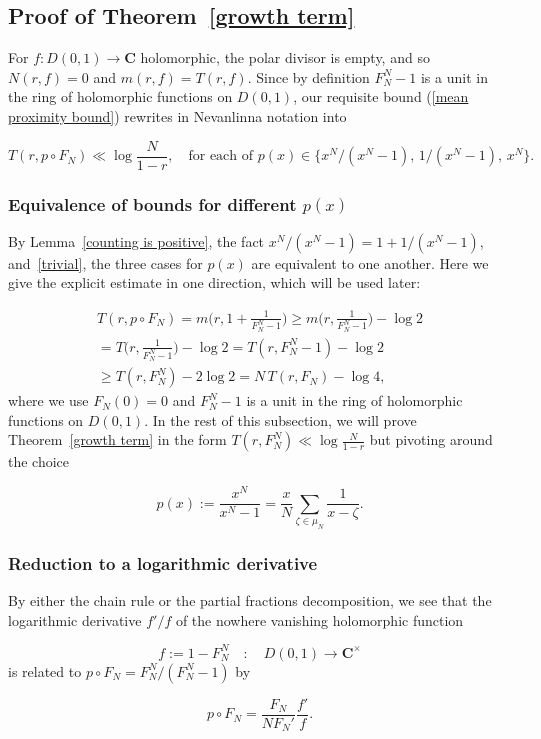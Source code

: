 \documentclass[10pt]{amsart}
\theoremstyle{remark}
\numberwithin{equation}{subsection}
\def\numequation{\addtocounter{subsubsection}{1}\begin{equation}}
\def\C{\mathbf{C}}
\begin{document}
\subsection{Proof of Theorem~\ref{growth term}}   \label{proof resumed}
For $f : D(0,1) \to \C$ holomorphic, the polar divisor is empty, and so $N(r,f) = 0$ and $m(r,f) = T(r,f)$. Since by definition
$F_N^N - 1$ is a unit in the ring of holomorphic functions on $D(0,1)$,  
 our requisite bound (\ref{mean proximity bound}) rewrites in Nevanlinna  notation into
\numequation  \label{Nevanlinna rewriting}
T(r, p \circ F_N) \ll \log{\frac{N}{1-r}}, \quad \textrm{for each of } p(x) \in \big\{ x^N / (x^N - 1), \, 1/(x^N-1), \, x^N \big\}.
\end{equation}
\subsubsection{Equivalence of bounds for different $p(x)$}
By Lemma~\ref{counting is positive}, the fact $x^N / (x^N - 1)=1+1/(x^N-1)$, and~\eqref{trivial}, the three cases for $p(x)$ are equivalent to one another. Here we give the explicit estimate in one direction, which will be used later: 
\numequation
\begin{split}
T(r, p \circ F_N)  =  m\Big(r, 1 + \frac{1}{F_N^N-1}\Big)  
\geq m\Big(r, \frac{1}{F_N^N-1}\Big) -\log{2} \\ 
 =  T\Big(r, \frac{1}{F_N^N-1}\Big) -\log{2} = T(r, F_N^N-1) -\log{2} \\
\label{bootstrap}
\geq T(r, F_N^N) - 2\log{2} = N \, T(r, F_N) - \log{4},
\end{split}
\end{equation}
where we use $F_N(0) = 0$ and $F_N^N-1$ is a unit in the ring of holomorphic functions on $D(0,1)$.
In the rest of this subsection, we will prove Theorem~\ref{growth term} in the form $T(r, F_N^N) \ll \log{\frac{N}{1-r}}$ 
but pivoting around the choice
\numequation \label{choice of p}
p(x) := \frac{x^N}{x^N-1} = \frac{x}{N} \sum_{\zeta \in \mu_N} \frac{1}{x-\zeta}.
\end{equation}



\subsubsection{Reduction to a logarithmic derivative}



By either the chain rule or the partial fractions decomposition, we see that the logarithmic derivative $f'/f$ of the nowhere vanishing holomorphic function 
\numequation \label{intermediary} 
f := 1-F_N^N \quad  : \quad D(0,1) \to \C^{\times}
\end{equation}
 is related to $p \circ F_N =  F_N^N / (F_N^N-1)$ by
\numequation \label{log derivative happy accident}
 p \circ F_N =   \frac{F_N}{NF_N'} \frac{f'}{f}.
\end{equation}
\end{document}
